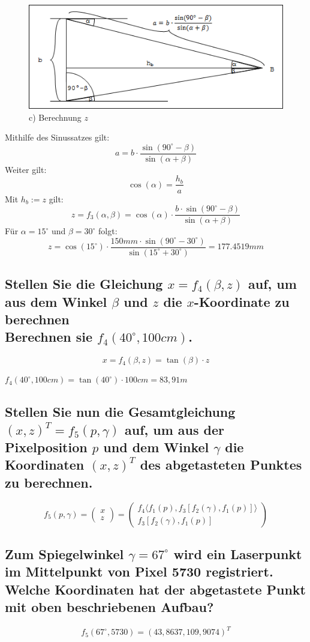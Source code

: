\documentclass[a4paper,10pt,DIV=14]{scrartcl}
\newcommand{\dg}[1]{#1^\circ}
\begin{document}
\begin{figure}[!htbp]
	\centering
	\includegraphics[width=.95\linewidth]{z.png}
	\caption*{c) Berechnung $z$}
\end{figure}

Mithilfe des Sinussatzes gilt: $$ a = b \cdot \frac{\sin(\dg{90} - \beta)}{\sin(\alpha + \beta)} $$
Weiter gilt: $$ \cos(\alpha) = \frac{h_b}{a} $$
Mit $h_b := z$ gilt:
$$ z = f_3(\alpha, \beta) = \cos(\alpha) \cdot \frac{b \cdot \sin(\dg{90} - \beta)}{\sin(\alpha + \beta)} $$
Für $\alpha = \dg{15}$ und $\beta = \dg{30}$ folgt:
$$ z = \cos(\dg{15}) \cdot \frac{150mm \cdot \sin(\dg{90} - \dg{30})}{\sin(\dg{15} + \dg{30})} = 177.4519mm $$

\subsection{Stellen Sie die Gleichung $x = f_4(\beta, z)$ auf, um aus dem Winkel $\beta$ und $z$ die $x$-Koordinate zu berechnen \\ Berechnen sie $f_4(40^\circ, 100cm)$.}

$$ x = f_4(\beta, z) = \tan(\beta) \cdot z $$

$f_4(\dg{40}, 100cm) = \tan(\dg{40}) \cdot 100cm = 83,91m$

\subsection{Stellen Sie nun die Gesamtgleichung $(x,z)^T = f_5(p, \gamma)$ auf, um aus der Pixelposition $p$ und dem Winkel $\gamma$ die Koordinaten $(x, z)^T$ des abgetasteten Punktes zu berechnen.}

$$ f_5(p, \gamma) = \begin{pmatrix} x \\ z \end{pmatrix} = \begin{pmatrix} f_4\langle f_1(p), f_3[f_2(\gamma), f_1(p)]\rangle \\ f_3[f_2(\gamma), f_1(p)] \end{pmatrix} $$

\subsection{Zum Spiegelwinkel $\gamma = 67^\circ$ wird ein Laserpunkt im Mittelpunkt von Pixel 5730 registriert. Welche Koordinaten hat der abgetastete Punkt mit oben beschriebenen Aufbau?}

$$ f_5(\dg{67}, 5730) = (43,8637, 109,9074)^T $$
\end{document}
